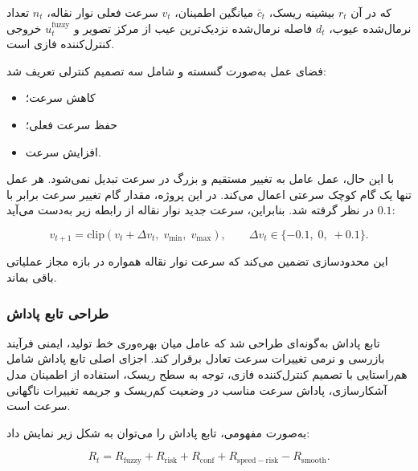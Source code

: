 \documentclass[a4paper, 10pt, twocolumn]{article}
\begin{document}
	که در آن $r_t$ بیشینه ریسک، $\bar{c}_t$ میانگین اطمینان، $v_t$ سرعت فعلی نوار نقاله، $n_t$ تعداد نرمال‌شده عیوب، $d_t$ فاصله نرمال‌شده نزدیک‌ترین عیب از مرکز تصویر و $u^{\mathrm{fuzzy}}_t$ خروجی کنترل‌کننده فازی است.
	
	فضای عمل به‌صورت گسسته و شامل سه تصمیم کنترلی تعریف شد:
	
	\begin{itemize}
		\item کاهش سرعت؛
		\item حفظ سرعت فعلی؛
		\item افزایش سرعت.
	\end{itemize}
	
	با این حال، عمل عامل به تغییر مستقیم و بزرگ در سرعت تبدیل نمی‌شود. هر عمل تنها یک گام کوچک سرعتی اعمال می‌کند. در این پروژه، مقدار گام تغییر سرعت برابر با $0.1$ در نظر گرفته شد. بنابراین، سرعت جدید نوار نقاله از رابطه زیر به‌دست می‌آید:
	
	\begin{latin}
		\begin{equation}
			v_{t+1} =
			\mathrm{clip}
			\left(
			v_t + \Delta v_t,\;
			v_{\min},\;
			v_{\max}
			\right),
			\qquad
			\Delta v_t \in \{-0.1,\;0,\;+0.1\}.
		\end{equation}
	\end{latin}
	
	این محدودسازی تضمین می‌کند که سرعت نوار نقاله همواره در بازه مجاز عملیاتی باقی بماند.
	
	\subsubsection*{طراحی تابع پاداش}
	
	تابع پاداش به‌گونه‌ای طراحی شد که عامل میان بهره‌وری خط تولید، ایمنی فرآیند بازرسی و نرمی تغییرات سرعت تعادل برقرار کند. اجزای اصلی تابع پاداش شامل هم‌راستایی با تصمیم کنترل‌کننده فازی، توجه به سطح ریسک، استفاده از اطمینان مدل آشکارسازی، پاداش سرعت مناسب در وضعیت کم‌ریسک و جریمه تغییرات ناگهانی سرعت است.
	
	به‌صورت مفهومی، تابع پاداش را می‌توان به شکل زیر نمایش داد:
	
	\begin{latin}
		\begin{equation}
			R_t =
			R_{\mathrm{fuzzy}}
			+
			R_{\mathrm{risk}}
			+
			R_{\mathrm{conf}}
			+
			R_{\mathrm{speed-risk}}
			-
			R_{\mathrm{smooth}}.
		\end{equation}
	\end{latin}
	
\end{document}
